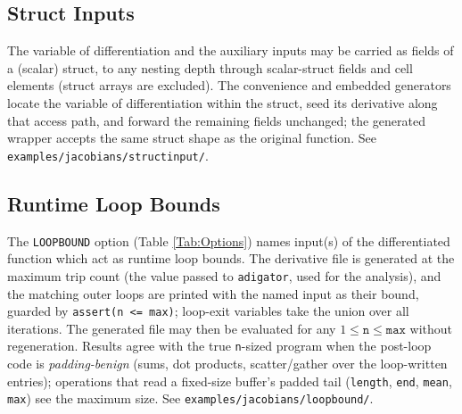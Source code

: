 \documentclass[10pt,pdftex]{article}
\begin{document}
\subsection{Struct Inputs}\label{SubSec:StructInput}
The variable of differentiation and the auxiliary inputs may be carried as fields of a (scalar) struct, to any nesting depth through scalar-struct fields and cell elements (struct arrays are excluded). The convenience and embedded generators locate the variable of differentiation within the struct, seed its derivative along that access path, and forward the remaining fields unchanged; the generated wrapper accepts the same struct shape as the original function. See \texttt{examples/jacobians/structinput/}.

\subsection{Runtime Loop Bounds}\label{SubSec:Loopbound}
The \texttt{LOOPBOUND} option (Table \ref{Tab:Options}) names input(s) of the differentiated function which act as runtime loop bounds. The derivative file is generated at the maximum trip count (the value passed to \texttt{adigator}, used for the analysis), and the matching outer loops are printed with the named input as their bound, guarded by \texttt{assert(n <= max)}; loop-exit variables take the union over all iterations. The generated file may then be evaluated for any $1 \le \texttt{n} \le \texttt{max}$ without regeneration. Results agree with the true \texttt{n}-sized program when the post-loop code is \emph{padding-benign} (sums, dot products, scatter/gather over the loop-written entries); operations that read a fixed-size buffer's padded tail (\texttt{length}, \texttt{end}, \texttt{mean}, \texttt{max}) see the maximum size. See \texttt{examples/jacobians/loopbound/}.
\end{document}

